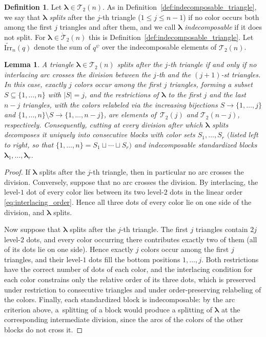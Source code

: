 \documentclass[10pt,a4paper]{amsart}
\numberwithin{equation}{section}
\newtheorem{Lemma}[Theorem]{Lemma}
\theoremstyle{definition}
\newtheorem{Definition}[Theorem]{Definition}
\begin{document}
\begin{Definition}
	\label{def:indecomposable_general}
	Let $\boldsymbol\lambda\in\mathcal{T}_2(n)$.
	As in Definition~\ref{def:indecomposable_triangle}, we say that
	$\boldsymbol\lambda$ \emph{splits} after the $j$-th triangle
	($1\le j\le n-1$) if no color occurs both among the first $j$ triangles
	and after them, and we call $\boldsymbol\lambda$ \emph{indecomposable}
	if it does not split.
	For $\boldsymbol\lambda\in\mathring{\mathcal{T}}_2(n)$ this is
	Definition~\ref{def:indecomposable_triangle}.
	Let $\widetilde{\mathrm{Irr}}_n(q)$ denote the sum of $q^{\psi}$ over
	the indecomposable elements of $\mathcal{T}_2(n)$.
\end{Definition}

\begin{Lemma}
	\label{lem:splitting_structure}
	A triangle $\boldsymbol\lambda\in\mathcal{T}_2(n)$ splits after the
	$j$-th triangle if and only if no interlacing arc crosses the division
	between the $j$-th and the $(j+1)$-st triangles.
	In this case, exactly $j$ colors occur among the first $j$ triangles,
	forming a subset $S\subseteq\{1,\dots,n\}$ with $|S|=j$, and the
	restrictions of $\boldsymbol\lambda$ to the first $j$ and the last
	$n-j$ triangles, with the colors relabeled via the increasing
	bijections $S\to\{1,\dots,j\}$ and
	$\{1,\dots,n\}\setminus S\to\{1,\dots,n-j\}$, are elements of~$\mathcal{T}_2(j)$ and $\mathcal{T}_2(n-j)$, respectively.
	Consequently, cutting at every division after which
	$\boldsymbol\lambda$ splits decomposes it uniquely into consecutive
	blocks with color sets $S_1,\dots,S_r$ $($listed left to right, so that
	$\{1,\dots,n\}=S_1\sqcup\cdots\sqcup S_r)$ and indecomposable
	standardized blocks $\boldsymbol\lambda_1,\dots,\boldsymbol\lambda_r$.
\end{Lemma}
\begin{proof}
	If $\boldsymbol\lambda$ splits after the $j$-th triangle, then in
	particular no arc crosses the division.
	Conversely, suppose that no arc crosses the division.
	By interlacing, the level-$1$ dot of every color lies between its two
	level-$2$ dots in the linear order \eqref{eq:interlacing_order}. Hence
	all three dots of every color lie on one side of the division, and
	$\boldsymbol\lambda$ splits.

	Now suppose that $\boldsymbol\lambda$ splits after the $j$-th
	triangle.
	The first $j$ triangles contain $2j$ level-$2$ dots, and every color
	occurring there contributes exactly two of them (all of its dots lie on
	one side). Hence exactly $j$ colors occur among the first $j$
	triangles, and their level-$1$ dots fill the bottom positions
	$1,\dots,j$.
	Both restrictions have the correct number of dots of each color, and
	the interlacing condition for each color constrains only the relative
	order of its three dots, which is preserved under restriction to
	consecutive triangles and under order-preserving relabeling of the
	colors.
	Finally, each standardized block is indecomposable: by the arc
	criterion above, a~splitting of a block would produce a splitting of
	$\boldsymbol\lambda$ at the corresponding intermediate division, since
	the arcs of the colors of the other blocks do not cross it.
\end{proof}
\end{document}
